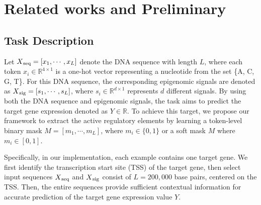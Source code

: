 \section{Related works and Preliminary}

\subsection{Task Description}
Let $X\textsubscript{seq} = [x_1, \cdots, x_L]$ denote the DNA sequence with length $L$, where each token $x_i \in \mathbb{R}^{4\times 1}$ is a one-hot vector representing a nucleotide from the set \{A, C, G, T\}. For this DNA sequence, the corresponding epigenomic  signals are denoted as $X\textsubscript{sig} = [s_1, \cdots, s_L]$, where $s_i \in \mathbb{R}^{d \times 1}$ represents $d$ different signals. 
By using both the DNA sequence and epigenomic signals, the task aims to predict the target gene expression denoted as $Y \in \mathbb{R}$.
To achieve this target, we propose our framework to extract the active regulatory elements by learning a token-level binary mask $M = [m_1, \cdots, m_L]$, where $m_i \in \{0, 1\}$ or a soft mask $M$ where $m_i \in [0, 1]$.

Specifically, in our implementation, each example contains one target gene. We first identify the transcription start site (TSS) of the target gene, then select input sequences $X\textsubscript{seq}$ and $X\textsubscript{sig}$ consist of $L = 200,000$ base pairs, centered on the TSS.
Then, the entire sequences provide sufficient contextual information for accurate prediction of the target gene expression value $Y$.

